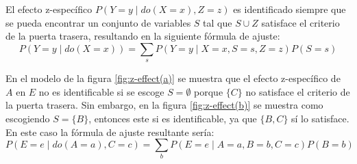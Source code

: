 \begin{theorem}
	El efecto z-específico $P(Y=y \mid do(X=x),Z=z)$ es identificado siempre que se pueda encontrar un conjunto de variables $S$ tal que $S \cup Z$ satisface el criterio de la puerta trasera, resultando en la siguiente fórmula de ajuste:
	\[ P(Y=y \mid do(X=x)) = \sum_{s} P(Y=y \mid X=x, S=s, Z=z)P(S=s)\]
\end{theorem}

En el modelo de la figura \ref{fig:z-effect(a)} se muestra que el efecto z-específico de $A$ en $E$ no es identificable si se escoge $S=\emptyset$ porque $\{C\}$ no satisface el criterio de la puerta trasera. Sin embargo, en la figura \ref{fig:z-effect(b)} se muestra como escogiendo $S=\{B\}$, entonces este si es identificable, ya que $\{B,C\}$ sí lo satisface. En este caso la fórmula de ajuste resultante sería:
\[ P(E=e \mid do(A=a),C=c) = \sum_{b} P(E=e \mid A=a, B=b, C=c)P(B=b) \] 

